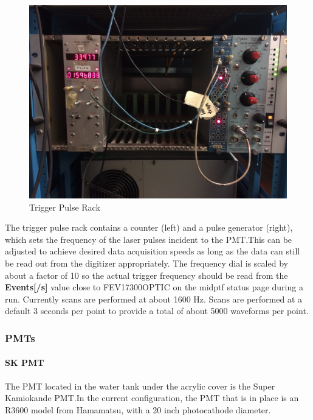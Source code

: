 \documentclass[twoside,letterpaper]{refart}
\newcommand{\picwidth}{0.7 \textwidth}
\begin{document}
\begin{figure}[!htpb]\centering
	\includegraphics[width=\picwidth]{images/nimCrate}
	\caption{Trigger Pulse Rack\label{vme}}
\end{figure}

\FloatBarrier

The trigger pulse rack contains a counter (left) and a pulse generator (right), which sets the frequency of the laser pulses incident to the PMT.\@ This can be adjusted to achieve desired data acquisition speeds as long as the data can still be read out from the digitizer appropriately. The frequency dial is scaled by about a factor of 10 so the actual trigger frequency should be read from the \textbf{Events[/s]} value close to FEV17300OPTIC on the midptf status page during a run. Currently scans are performed at about 1600 Hz. Scans are performed at a default 3 seconds per point to provide a total of about 5000 waveforms per point.



\subsubsection{PMTs}

\paragraph{SK PMT}

The PMT located in the water tank under the acrylic cover is the Super Kamiokande PMT.\@ In the current configuration, the PMT that is in place is an R3600 model from Hamamatsu, with a 20 inch photocathode diameter.
\end{document}
